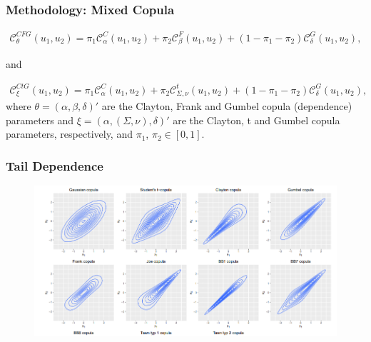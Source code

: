 \documentclass[pdf,9pt,xcolor=dvipsnames,hide notes]{beamer}
\begin{document}
\begin{frame}[label=frame4i]
\frametitle{Methodology: Mixed Copula}

\begin{eqnarray*}
	\mathcal{C}_{\theta}^{CFG}\left(u_{1},u_{2}\right)=\pi_{1}\mathcal{C}_{\alpha}^{C}\left(u_{1},u_{2}\right)+\pi_{2}\mathcal{C}_{\beta}^{F}\left(u_{1},u_{2}\right)+\left(1-\pi_{1}-\pi_{2}\right)\mathcal{C}_{\delta}^{G}\left(u_{1},u_{2}\right),
\end{eqnarray*}

and

\begin{eqnarray*}
	\mathcal{C}_{\xi}^{CtG}\left(u_{1},u_{2}\right)=\pi_{1}\mathcal{C}_{\alpha}^{C}\left(u_{1},u_{2}\right)+\pi_{2}\mathcal{C}_{\Sigma,\nu}^{t}\left(u_{1},u_{2}\right)+\left(1-\pi_{1}-\pi_{2}\right)\mathcal{C}_{\delta}^{G}\left(u_{1},u_{2}\right),
\end{eqnarray*}
where $\theta=\left(\alpha,\beta,\delta\right)'$ are the Clayton, Frank and Gumbel copula (dependence) parameters and $\xi=\left(\alpha,(\Sigma,\nu),\delta\right)'$ are the Clayton, t and Gumbel copula parameters, respectively, and $\pi_{1}$, $\pi_{2} \in [0,1]$. 

\end{frame}

\begin{frame}
\frametitle{Tail Dependence}

\begin{figure}[htbp]
	\centering
	\includegraphics[scale=0.5]{taildep.png}
	\label{fig:fig1}
\end{figure}

\end{frame}
\end{document}
